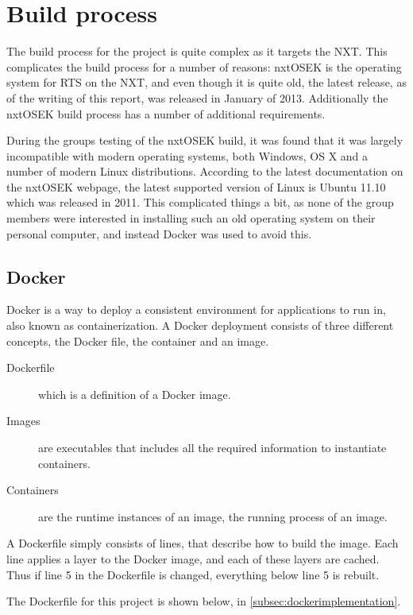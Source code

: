 \section{Build process}\label{sec:buildprocess}
The build process for the project is quite complex as it targets the NXT.
This complicates the build process for a number of reasons:
nxtOSEK is the operating system for RTS on the NXT, and even though it is quite old, the latest release, as of the writing of this report, was released in January of 2013\cite{osekrelease}.
Additionally the nxtOSEK build process has a number of additional requirements.

During the groups testing of the nxtOSEK build, it was found that it was largely incompatible with modern operating systems, both Windows, OS X and a number of modern Linux distributions.
According to the latest documentation on the nxtOSEK webpage, the latest supported version of Linux is Ubuntu 11.10 which was released in 2011.
This complicated things a bit, as none of the group members were interested in installing such an old operating system on their personal computer, and instead Docker was used to avoid this.

\subsection{Docker}\label{subsec:docker}
Docker is a way to deploy a consistent environment for applications to run in, also known as containerization\cite{dockerdocstart}.
A Docker deployment consists of three different concepts, the Docker file, the container and an image.
\begin{description}
    \item [Dockerfile] which is a definition of a Docker image.
    \item [Images] are executables that includes all the required information to instantiate containers.
    \item[Containers] are the runtime instances of an image, the running process of an image.
\end{description}

A Dockerfile simply consists of lines, that describe how to build the image.
Each line applies a layer to the Docker image, and each of these layers are cached.
Thus if line 5 in the Dockerfile is changed, everything below line 5 is rebuilt.

The Dockerfile for this project is shown below, in \autoref{subsec:dockerimplementation}.

